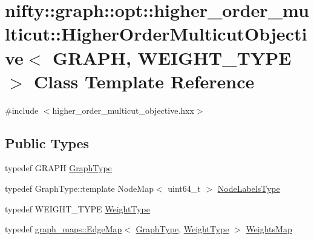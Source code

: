 \hypertarget{classnifty_1_1graph_1_1opt_1_1higher__order__multicut_1_1HigherOrderMulticutObjective}{}\section{nifty\+:\+:graph\+:\+:opt\+:\+:higher\+\_\+order\+\_\+multicut\+:\+:Higher\+Order\+Multicut\+Objective$<$ G\+R\+A\+PH, W\+E\+I\+G\+H\+T\+\_\+\+T\+Y\+PE $>$ Class Template Reference}
\label{classnifty_1_1graph_1_1opt_1_1higher__order__multicut_1_1HigherOrderMulticutObjective}


{\ttfamily \#include $<$higher\+\_\+order\+\_\+multicut\+\_\+objective.\+hxx$>$}

\subsection*{Public Types}
\begin{DoxyCompactItemize}
\item 
typedef G\+R\+A\+PH \hyperlink{classnifty_1_1graph_1_1opt_1_1higher__order__multicut_1_1HigherOrderMulticutObjective_a177204e42faa461d572976de69fbf3b9}{Graph\+Type}
\item 
typedef Graph\+Type\+::template Node\+Map$<$ uint64\+\_\+t $>$ \hyperlink{classnifty_1_1graph_1_1opt_1_1higher__order__multicut_1_1HigherOrderMulticutObjective_a4584ff3b56277da6d231c6e2c76d75c4}{Node\+Labels\+Type}
\item 
typedef W\+E\+I\+G\+H\+T\+\_\+\+T\+Y\+PE \hyperlink{classnifty_1_1graph_1_1opt_1_1higher__order__multicut_1_1HigherOrderMulticutObjective_ac36de4a6a975540630cb89af6d5d83b2}{Weight\+Type}
\item 
typedef \hyperlink{structnifty_1_1graph_1_1graph__maps_1_1EdgeMap}{graph\+\_\+maps\+::\+Edge\+Map}$<$ \hyperlink{classnifty_1_1graph_1_1opt_1_1higher__order__multicut_1_1HigherOrderMulticutObjective_a177204e42faa461d572976de69fbf3b9}{Graph\+Type}, \hyperlink{classnifty_1_1graph_1_1opt_1_1higher__order__multicut_1_1HigherOrderMulticutObjective_ac36de4a6a975540630cb89af6d5d83b2}{Weight\+Type} $>$ \hyperlink{classnifty_1_1graph_1_1opt_1_1higher__order__multicut_1_1HigherOrderMulticutObjective_ae3dca1bc16e023da893b0a69d01d6382}{Weights\+Map}
\end{DoxyCompactItemize}
